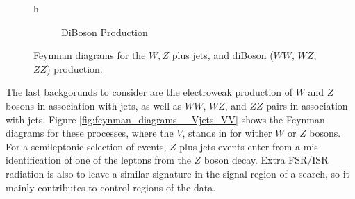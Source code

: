 \begin{figure}{h}
\begin{subfigure}[h]{0.3\textwidth}
        \caption{DiBoson Production}\label{fd:VV}
      \end{subfigure}
      \caption{Feynman diagrams for the $W,Z$ plus jets, and diBoson
        ($WW$, $WZ$, $ZZ$) production.} \label{fig:feynman_diagrams__Vjets__VV}
\end{figure}

\par The last backgorunds to consider are the electroweak production
of $W$ and $Z$ bosons in association with jets, as well as $WW$, $WZ$, and
$ZZ$ pairs in association with jets.  Figure
\ref{fig:feynman_diagrams__Vjets_VV} shows the Feynman diagrams for
these processes, where the $V$, stands in for wither $W$ or $Z$
bosons.  For a semileptonic selection of \ttH events, $Z$ plus jets
events enter from a mis-identification of one of the leptons from the
$Z$ boson decay.  Extra FSR/ISR radiation is also to leave a similar
signature in the signal region of a \ttH search, so it mainly
contributes to control regions of the data.  

